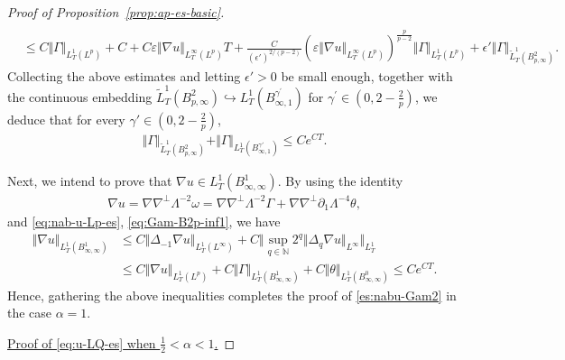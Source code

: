 \documentclass[reqno,11pt,a4paper]{amsart}
\begin{document}
\begin{proof}[Proof of Proposition~\ref{prop:ap-es-basic}]
\begin{align}
  \nonumber\\
   & \leq C \Vert \Gamma\Vert _{L^1_T(L^p)}  + C 
  +  C \varepsilon\Vert \nabla u\Vert _{L^\infty_T(L^p)}
  T + \tfrac{C }{(\epsilon')^{2/(p-2)}}(\varepsilon\Vert \nabla u\Vert _{L^\infty_T(L^p)})^{\frac{p}{p-2}}
 \Vert \Gamma\Vert _{L^1_T(L^p)} + \epsilon' \Vert \Gamma\Vert _{\widetilde{L}^1_T(B^2_{p,\infty})}. \nonumber 
\end{align}
Collecting the above estimates and letting $\epsilon'>0$ be small enough, together with the continuous embedding 
$\widetilde{L}_T^1 (B^2_{p,\infty}) \hookrightarrow L_T^1(B^{\gamma^\prime}_{\infty,1})$ 
for $\gamma^\prime\in(0,2-\frac{2}{p})$, we deduce that for every 
$\gamma'\in (0,2-\frac{2}{p})$,
\begin{align}\label{eq:Gam-B2p-inf1}
  \Vert \Gamma\Vert _{\widetilde{L}^1_T(B^{2}_{p,\infty})} 
  + \Vert \Gamma\Vert _{L^1_T(B^{\gamma'}_{\infty,1})} \leq C e^{CT}.
\end{align}

Next, we intend to prove that $\nabla u\in L^1_T(B^{1}_{\infty,\infty})$. 
By using the identity
\begin{align}\label{eq:nab-u-rela}
  \nabla u = \nabla \nabla^\perp \Lambda^{-2} \omega 
  = \nabla \nabla^\perp \Lambda^{-2} \Gamma + \nabla \nabla^\perp \partial_1 \Lambda^{-4} \theta,
\end{align}
and \eqref{eq:nab-u-Lp-es}, \eqref{eq:Gam-B2p-inf1}, we have
\begin{equation}\label{eq:nab-u-B1inf}
\begin{split}
  \Vert \nabla u\Vert _{L^1_T(B^1_{\infty,\infty})} & \leq C \Vert \Delta_{-1}\nabla u\Vert _{L^1_T(L^\infty)} +
  C \Big\Vert  \sup_{q\in \mathbb{N}}2^{q} \Vert \Delta_q \nabla u\Vert _{L^\infty} \Big\Vert _{L^1_T} \\
  & \leq C\Vert \nabla u\Vert _{L^1_T(L^p)} + C \Vert \Gamma\Vert _{L^1_T(B^1_{\infty,\infty})} + C \Vert \theta\Vert _{L^1_T(B^0_{\infty,\infty})}\leq C e^{CT}.
\end{split}
\end{equation}
Hence, gathering the above inequalities completes the proof of \eqref{es:nabu-Gam2}
in the case $\alpha=1$.

\underline{Proof of \eqref{eq:u-LQ-es} when $\frac{1}{2}<\alpha < 1$.}


\end{proof}
\end{document}

